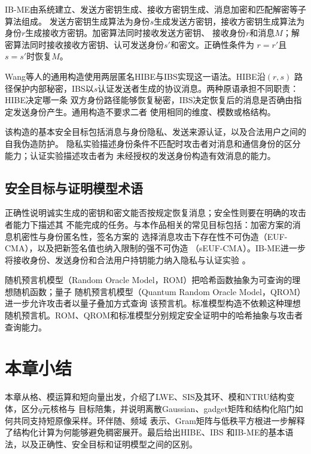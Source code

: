 \begin{mathchapterlayout}
IB-ME由系统建立、发送方密钥生成、接收方密钥生成、消息加密和匹配解密等子算法组成。
发送方密钥生成算法为身份$s$生成发送方密钥，接收方密钥生成算法为身份$r$生成接收方密钥。加密算法同时接收发送方密钥、
接收身份$r$和消息$M$；解密算法同时接收接收方密钥、认可发送身份$s'$和密文。正确性条件为
$r=r'$且$s=s'$时恢复$M$。

Wang等人的通用构造使用两层匿名HIBE与IBS实现这一语法\cite{wang2024ibme}。HIBE沿$(r,s)$
路径保护内部秘密，IBS以$s$认证发送者生成的协议消息。两种原语承担不同职责：HIBE决定哪一条
双方身份路径能够恢复秘密，IBS决定恢复后的消息是否确由指定发送身份产生。通用构造不要求二者
使用相同的维度、模数或格结构。

该构造的基本安全目标包括消息与身份隐私、发送来源认证，以及合法用户之间的自我伪造防护。
隐私实验描述身份条件不匹配时攻击者对消息和通信身份的区分能力；认证实验描述攻击者为
未经授权的发送身份构造有效消息的能力。

\subsection{安全目标与证明模型术语}

正确性说明诚实生成的密钥和密文能否按规定恢复消息；安全性则要在明确的攻击者能力下描述其
不能完成的任务。与本作品相关的常见目标包括：加密方案的消息机密性与身份匿名性，签名方案的
选择消息攻击下存在性不可伪造（EUF-CMA），以及把新签名值也纳入限制的强不可伪造
（sEUF-CMA）。IB-ME进一步将接收身份、发送身份和合法用户持钥能力纳入隐私与认证实验
\cite{wang2024ibme,sageloli2023ibs}。

随机预言机模型（Random Oracle Model，ROM）把哈希函数抽象为可查询的理想随机函数；量子
随机预言机模型（Quantum Random Oracle Model，QROM）进一步允许攻击者以量子叠加方式查询
该预言机。标准模型构造不依赖这种理想随机预言机。ROM、QROM和标准模型分别规定安全证明中的哈希抽象与攻击者查询能力。

\section{本章小结}

本章从格、模运算和短向量出发，介绍了LWE、SIS及其环、模和NTRU结构变体，区分$q$元核格与
目标陪集，并说明离散Gaussian、gadget矩阵和结构化陷门如何共同支持短原像采样。环伴随、频域
表示、Gram矩阵与低秩平方根进一步解释了结构化计算为何能够避免稠密展开。最后给出HIBE、IBS
和IB-ME的基本语法，以及正确性、安全目标和证明模型之间的区别。

\end{mathchapterlayout}
